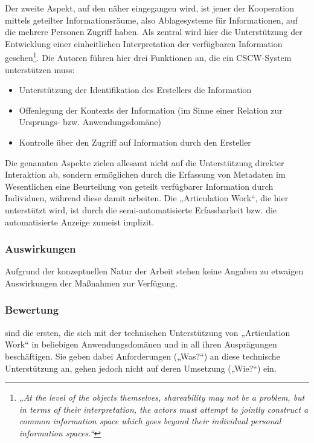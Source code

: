 Der zweite Aspekt, auf den näher eingegangen wird, ist jener der Kooperation mittels geteilter Informationsräume, also Ablagesysteme für Informationen, auf die mehrere Personen Zugriff haben. Als zentral wird hier die Unterstützung der Entwicklung einer einheitlichen Interpretation der verfügbaren Information gesehen\footnote{\emph{„At the level of the objects themselves, shareability may not be a problem, but in terms of their interpretation, the actors must attempt to jointly construct a common information space which goes beyond their individual personal information spaces.“}\citep[][S. 21]{Schmidt92}}. Die Autoren führen hier drei Funktionen an, die ein \gls{CSCW}-System unterstützen muss:
\begin{itemize}
	\item Unterstützung der Identifikation des Erstellers die Information
	\item Offenlegung der Kontexts der Information (im Sinne einer Relation zur Ursprungs- bzw. Anwendungsdomäne)
	\item Kontrolle über den Zugriff auf Information durch den Ersteller
\end{itemize}
Die genannten Aspekte zielen allesamt nicht auf die Unterstützung direkter Interaktion ab, sondern ermöglichen durch die Erfassung von Metadaten im Wesentlichen eine Beurteilung von geteilt verfügbarer Information durch Individuen, während diese damit arbeiten. Die „Articulation Work“, die hier unterstützt wird, ist durch die semi-automatisierte Erfassbarkeit bzw. die automatisierte Anzeige zumeist implizit. 

\subsubsection{Auswirkungen}

Aufgrund der konzeptuellen Natur der Arbeit stehen keine Angaben zu etwaigen Auswirkungen der Maßnahmen zur Verfügung.

\subsubsection{Bewertung}

\citet{Schmidt92} sind die ersten, die sich mit der technischen Unterstützung von „Articulation Work“ in beliebigen Anwendungsdomänen und in all ihren Ausprägungen beschäftigen. Sie geben dabei Anforderungen („Was?“) an diese technische Unterstützung an, gehen jedoch nicht auf deren Umsetzung („Wie?“) ein.

